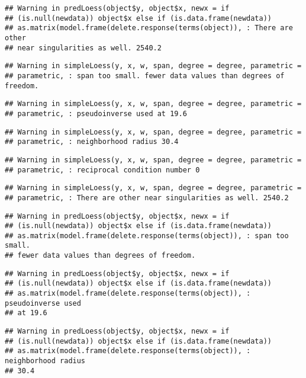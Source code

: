 \documentclass[]{article}
\begin{document}
\begin{verbatim}
## Warning in predLoess(object$y, object$x, newx = if
## (is.null(newdata)) object$x else if (is.data.frame(newdata))
## as.matrix(model.frame(delete.response(terms(object)), : There are other
## near singularities as well. 2540.2
\end{verbatim}

\begin{verbatim}
## Warning in simpleLoess(y, x, w, span, degree = degree, parametric =
## parametric, : span too small. fewer data values than degrees of freedom.
\end{verbatim}

\begin{verbatim}
## Warning in simpleLoess(y, x, w, span, degree = degree, parametric =
## parametric, : pseudoinverse used at 19.6
\end{verbatim}

\begin{verbatim}
## Warning in simpleLoess(y, x, w, span, degree = degree, parametric =
## parametric, : neighborhood radius 30.4
\end{verbatim}

\begin{verbatim}
## Warning in simpleLoess(y, x, w, span, degree = degree, parametric =
## parametric, : reciprocal condition number 0
\end{verbatim}

\begin{verbatim}
## Warning in simpleLoess(y, x, w, span, degree = degree, parametric =
## parametric, : There are other near singularities as well. 2540.2
\end{verbatim}

\begin{verbatim}
## Warning in predLoess(object$y, object$x, newx = if
## (is.null(newdata)) object$x else if (is.data.frame(newdata))
## as.matrix(model.frame(delete.response(terms(object)), : span too small.
## fewer data values than degrees of freedom.
\end{verbatim}

\begin{verbatim}
## Warning in predLoess(object$y, object$x, newx = if
## (is.null(newdata)) object$x else if (is.data.frame(newdata))
## as.matrix(model.frame(delete.response(terms(object)), : pseudoinverse used
## at 19.6
\end{verbatim}

\begin{verbatim}
## Warning in predLoess(object$y, object$x, newx = if
## (is.null(newdata)) object$x else if (is.data.frame(newdata))
## as.matrix(model.frame(delete.response(terms(object)), : neighborhood radius
## 30.4
\end{verbatim}
\end{document}
